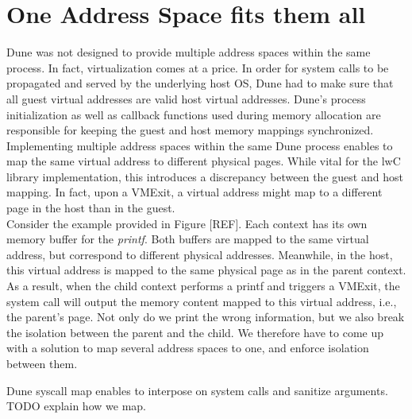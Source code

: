 \section{One Address Space fits them all}
Dune was not designed to provide multiple address spaces within the same process.
In fact, virtualization comes at a price.
In order for system calls to be propagated and served by the underlying host OS, Dune had to make sure that all guest virtual addresses are valid host virtual addresses.
Dune's process initialization as well as callback functions used during memory allocation are responsible for keeping the guest and host memory mappings synchronized.\\
Implementing multiple address spaces within the same Dune process enables to map the same virtual address to different physical pages.
While vital for the lwC library implementation, this introduces a discrepancy between the guest and host mapping.
In fact, upon a VMExit, a virtual address might map to a different page in the host than in the guest.\\
Consider the example provided in Figure [REF].
Each context has its own memory buffer for the \emph{printf}.
Both buffers are mapped to the same virtual address, but correspond to different physical addresses.
Meanwhile, in the host, this virtual address is mapped to the same physical page as in the parent context.
As a result, when the child context performs a printf and triggers a VMExit, the system call will output the memory content mapped to this virtual address, i.e., the parent's page.
Not only do we print the wrong information, but we also break the isolation between the parent and the child.
We therefore have to come up with a solution to map several address spaces to one, and enforce isolation between them.

Dune syscall map enables to interpose on system calls and sanitize arguments.\\
TODO explain how we map. 

